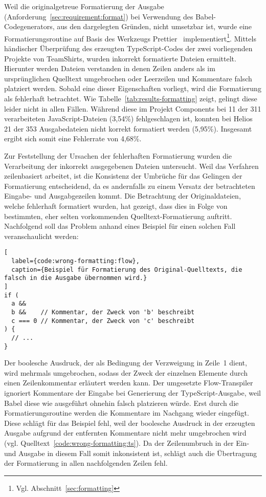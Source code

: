 Weil die originalgetreue Formatierung der Ausgabe (Anforderung~\ref{sec:requirement:format}) bei Verwendung des Babel-Codegenerators, aus den dargelegten Gründen, nicht umsetzbar ist, wurde eine Formatierungsroutine auf Basis des Werkzeugs Prettier~\autocite{SOFTWARE:PRETTIER} implementiert\footnote{Vgl. Abschnitt~\ref{sec:formatting}}.
Mittels händischer Überprüfung des erzeugten TypeScript-Codes der zwei vorliegenden Projekte von TeamShirts, wurden inkorrekt formatierte Dateien ermittelt. Hierunter werden Dateien verstanden in denen Zeilen anders als im ursprünglichen Quelltext umgebrochen oder Leerzeilen und Kommentare falsch platziert werden. Sobald eine dieser Eigenschaften vorliegt, wird die Formatierung als fehlerhaft betrachtet. Wie Tabelle~\ref{tab:results-formatting} zeigt, gelingt diese leider nicht in allen Fällen. Während diese im Projekt Components bei 11 der 311 verarbeiteten JavaScript-Dateien (3,54\%) fehlgeschlagen ist, konnten bei Helios 21 der 353 Ausgabedateien nicht korrekt formatiert werden (5,95\%). Insgesamt ergibt sich somit eine Fehlerrate von 4,68\%.

\bigbreak


\medbreak
Zur Feststellung der Ursachen der fehlerhaften Formatierung wurden die Verarbeitung der inkorrekt ausgegebenen Dateien untersucht. Weil das Verfahren zeilenbasiert arbeitet, ist die Konsistenz der Umbrüche für das Gelingen der Formatierung entscheidend, da es andernfalls zu einem Versatz der betrachteten Eingabe- und Ausgabgezeilen kommt. Die Betrachtung der Originaldateien, welche fehlerhaft formatiert wurden, hat gezeigt, dass dies in Folge von bestimmten, eher selten vorkommenden Quelltext-Formatierung auftritt. Nachfolgend soll das Problem anhand eines Beispiel für einen solchen Fall veranschaulicht werden:

\begin{lstlisting}[
  label={code:wrong-formatting:flow},
  caption={Beispiel für Formatierung des Original-Quelltexts, die falsch in die Ausgabe übernommen wird.}
]
if (
  a &&
  b &&    // Kommentar, der Zweck von 'b' beschreibt
  c === 0 // Kommentar, der Zweck von 'c' beschreibt
) {
  // ...
}
\end{lstlisting}

Der boolesche Ausdruck, der als Bedingung der Verzweigung in Zeile~1 dient, wird mehrmals umgebrochen, sodass der Zweck der einzelnen Elemente durch einen Zeilenkommentar erläutert werden kann. Der umgesetzte Flow-Transpiler ignoriert Kommentare der Eingabe bei Generierung der TypeScript-Ausgabe, weil Babel diese wie ausgeführt ohnehin falsch platzieren würde. Erst durch die Formatierungsroutine werden die Kommentare im Nachgang wieder eingefügt. Diese schlägt für das Beispiel fehl, weil der boolesche Ausdruck in der erzeugten Ausgabe aufgrund der entfernten Kommentare nicht mehr umgebrochen wird (vgl. Quelltext~\ref{code:wrong-formatting:ts}). Da der Zeilenumbruch in der Ein- und Ausgabe in diesem Fall somit inkonsistent ist, schlägt auch die Übertragung der Formatierung in allen nachfolgenden Zeilen fehl.


